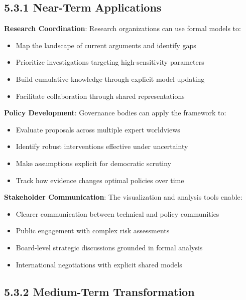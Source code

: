 \documentclass[
  11pt,
  letterpaper,
  openany]{book}
\providecommand{\tightlist}{%
  \setlength{\itemsep}{0pt}\setlength{\parskip}{0pt}}
\begin{document}
\subsection{5.3.1 Near-Term
Applications}\label{sec-near-term-applications}

\textbf{Research Coordination}: Research organizations can use formal
models to:

\begin{itemize}
\tightlist
\item
  Map the landscape of current arguments and identify gaps
\item
  Prioritize investigations targeting high-sensitivity parameters
\item
  Build cumulative knowledge through explicit model updating
\item
  Facilitate collaboration through shared representations
\end{itemize}

\textbf{Policy Development}: Governance bodies can apply the framework
to:

\begin{itemize}
\tightlist
\item
  Evaluate proposals across multiple expert worldviews
\item
  Identify robust interventions effective under uncertainty
\item
  Make assumptions explicit for democratic scrutiny
\item
  Track how evidence changes optimal policies over time
\end{itemize}

\textbf{Stakeholder Communication}: The visualization and analysis tools
enable:

\begin{itemize}
\tightlist
\item
  Clearer communication between technical and policy communities
\item
  Public engagement with complex risk assessments
\item
  Board-level strategic discussions grounded in formal analysis
\item
  International negotiations with explicit shared models
\end{itemize}

\subsection{5.3.2 Medium-Term Transformation}\label{sec-medium-term}
\end{document}
